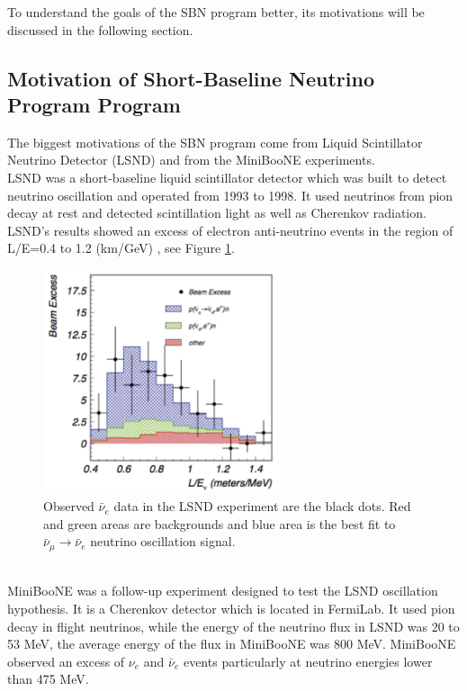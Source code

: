 \documentclass[a4paper]{article}\linespread{1.4}
\begin{document}
To understand the goals of the SBN program better, its motivations will be discussed in the following section.

\subsection{Motivation of Short-Baseline Neutrino Program Program}

The biggest motivations of the SBN program come from Liquid Scintillator Neutrino Detector (LSND) and from the MiniBooNE experiments.
\\LSND was a short-baseline liquid scintillator detector which was built to detect neutrino oscillation and operated from 1993 to 1998. It used neutrinos from pion decay at rest and detected scintillation light as well as Cherenkov radiation. LSND's results showed an excess of electron anti-neutrino events in the region of L/E=0.4 to 1.2 (km/GeV) \cite{K}, %
see Figure \ref{fig:lsnd}.
\begin{figure}[h!] \centering \includegraphics[width=70mm,scale=1.0]{figures/lsnd.png} \caption{Observed $\bar{\nu}_{e}$ data in the LSND experiment are the black dots. Red and green areas are backgrounds and blue area is the best fit to $\bar{\nu}_{\mu} \to  \bar{\nu}_{e}$ neutrino oscillation signal. \cite{MN}} \label{fig:lsnd} \end{figure}  
\\MiniBooNE was a follow-up experiment designed to test the LSND oscillation hypothesis.
It is a Cherenkov detector which is located in FermiLab. It used pion decay in flight neutrinos,
while the energy of the neutrino flux in LSND was 20 to 53 MeV, the average energy of the flux in MiniBooNE was 800 MeV.
MiniBooNE observed an excess of $\nu_{e}$ and  $\bar{\nu}_{e}$ events particularly at neutrino energies lower than 475 MeV.
\end{document}

